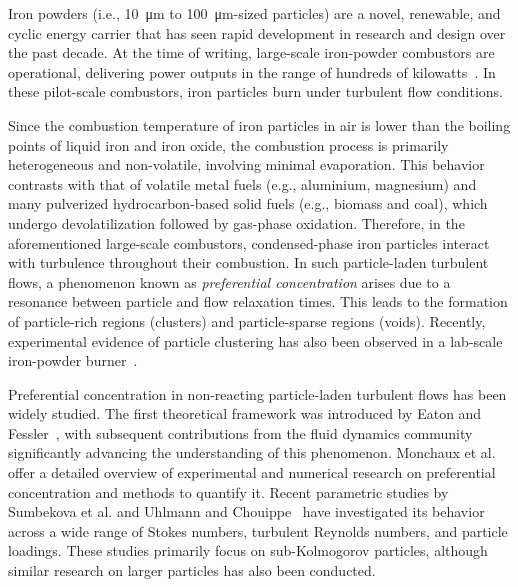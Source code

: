 \documentclass[authoryear,preprint,review,12pt]{elsarticle}
\newcommand{\green}{}
\begin{document}

{\green
Iron powders (i.e., \SI{10}{\micro\meter} to \SI{100}{\micro\meter}-sized particles) are a novel, renewable, and cyclic energy carrier that has seen rapid development in research and design over the past decade. At the time of writing, large-scale iron-powder combustors are operational, delivering power outputs in the range of hundreds of kilowatts~\cite{niekthesis}. In these pilot-scale combustors, iron particles burn under turbulent flow conditions.

Since the combustion temperature of iron particles in air is lower than the boiling points of liquid iron and iron oxide, the combustion process is primarily heterogeneous and non-volatile, involving minimal evaporation. This behavior contrasts with that of volatile metal fuels (e.g., aluminium, magnesium) and many pulverized hydrocarbon-based solid fuels (e.g., biomass and coal), which undergo devolatilization followed by gas-phase oxidation. Therefore, in the aforementioned large-scale combustors, condensed-phase iron particles interact with turbulence throughout their combustion. In such particle-laden turbulent flows, a phenomenon known as \textit{preferential concentration} arises due to a resonance between particle and flow relaxation times. This leads to the formation of particle-rich regions (clusters) and particle-sparse regions (voids). Recently, experimental evidence of particle clustering has also been observed in a lab-scale iron-powder burner~\cite{STEFFENS2025}.

Preferential concentration in non-reacting particle-laden turbulent flows has been widely studied. The first theoretical framework was introduced by Eaton and Fessler~\cite{Eaton1994}, with subsequent contributions from the fluid dynamics community significantly advancing the understanding of this phenomenon. Monchaux et al. \cite{Monchaux2012} offer a detailed overview of experimental and numerical research on preferential concentration and methods to quantify it. Recent parametric studies by Sumbekova et al. \cite{Sumbekova} and Uhlmann and Chouippe~\cite{Uhlmann} have investigated its behavior across a wide range of Stokes numbers, turbulent Reynolds numbers, and particle loadings. These studies primarily focus on sub-Kolmogorov particles, although similar research on larger particles has also been conducted.

}
\end{document}
